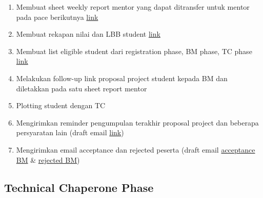 \documentclass[
]{book}
\providecommand{\tightlist}{%
  \setlength{\itemsep}{0pt}\setlength{\parskip}{0pt}}
\begin{document}
\begin{enumerate}
\def\labelenumi{\arabic{enumi}.}
\tightlist
\item
  Membuat sheet weekly report mentor yang dapat ditransfer untuk mentor pada pace berikutnya \href{https://docs.google.com/spreadsheets/d/1kDS77uA1uYJJyS_Oatv_WJTKEOiYXZgkUyEF3CEXo-M/edit\#gid=223180597}{link}
\item
  Membuat rekapan nilai dan LBB student \href{https://docs.google.com/spreadsheets/d/1kDS77uA1uYJJyS_Oatv_WJTKEOiYXZgkUyEF3CEXo-M/edit\#gid=2041422256}{link}
\item
  Membuat list eligible student dari registration phase, BM phase, TC phase \href{https://docs.google.com/spreadsheets/d/1kDS77uA1uYJJyS_Oatv_WJTKEOiYXZgkUyEF3CEXo-M/edit\#gid=43809870}{link}
\item
  Melakukan follow-up link proposal project student kepada BM dan diletakkan pada satu sheet report mentor
\item
  Plotting student dengan TC
\item
  Mengirimkan reminder pengumpulan terakhir proposal project dan beberapa persyaratan lain (draft email \href{https://docs.google.com/document/d/1EDYH3DnzUElPApt2pIBEh9HJV5d7K0OmmsTOs5BmcKI/edit\#heading=h.eaf8e2km1m0z}{link})
\item
  Mengirimkan email acceptance dan rejected peserta (draft email \href{https://docs.google.com/document/d/1EDYH3DnzUElPApt2pIBEh9HJV5d7K0OmmsTOs5BmcKI/edit\#heading=h.y18cmaj9rlr8}{acceptance BM} \& \href{https://docs.google.com/document/d/1EDYH3DnzUElPApt2pIBEh9HJV5d7K0OmmsTOs5BmcKI/edit\#heading=h.lwhoq5jstbkk}{rejected BM})
\end{enumerate}

\hypertarget{technical-chaperone-phase}{%
\subsection{Technical Chaperone Phase}\label{technical-chaperone-phase}}
\end{document}
